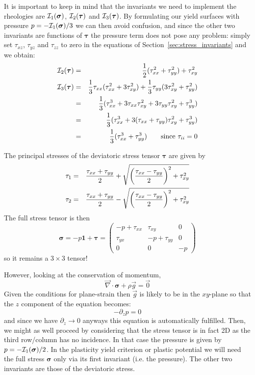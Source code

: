 It is important to keep in mind that the invariants we need to implement 
the rheologies are ${\cal I}_1({\bm \sigma})$,  ${\cal I}_2({\bm \tau})$ and ${\cal I}_3({\bm \tau})$.
By formulating our yield surfaces with pressure $p=-{\cal I}_1({\bm \sigma})/3$ we can then 
avoid confusion, and since the other two invariants are functions of ${\bm \tau}$ the pressure 
term does not pose any problem: simply set $\tau_{xz}$, $\tau_{yz}$ and $\tau_{zz}$ to zero in the 
equations of Section~\ref{sec:stress_invariants} and we obtain:
\begin{eqnarray}
{\cal I}_2({\bm \tau}) &=&\frac{1}{2}(\tau_{xx}^2 + \tau_{yy}^2 ) + \tau_{xy}^2 \\ 
{\cal I}_3({\bm \tau}) 
&=& \frac{1}{3} \tau_{xx} (  \tau_{xx}^2 + 3 \tau_{xy}^2 ) 
+ \frac{1}{3} \tau_{yy} (3 \tau_{xy}^2 +   \tau_{yy}^2 )   \nonumber\\
&=& \frac{1}{3}(  \tau_{xx}^3 + 3 \tau_{xx}\tau_{xy}^2  
+ 3 \tau_{yy} \tau_{xy}^2 +   \tau_{yy}^3 )   \nonumber\\
&=& \frac{1}{3}(  \tau_{xx}^3 + 3 (\tau_{xx}+\tau_{yy}) \tau_{xy}^2  +  \tau_{yy}^3 )   \nonumber\\
&=& \frac{1}{3}(  \tau_{xx}^3 +  \tau_{yy}^3 )  \qquad \text{since } \tau_{ii}=0 
\end{eqnarray}



The principal stresses of the deviatoric stress tensor $\bm\tau$ are given by
\begin{eqnarray}
\tau_1 &=& \frac{ \tau_{xx}+\tau_{yy}}{2} 
+ \sqrt{ \left(\frac{\tau_{xx}-\tau_{yy}}{2}\right)^2 +\tau_{xy}^2 } \nonumber\\
\tau_2 &=& \frac{ \tau_{xx}+\tau_{yy}}{2} 
- \sqrt{ \left(\frac{\tau_{xx}-\tau_{yy}}{2}\right)^2 +\tau_{xy}^2 } 
\end{eqnarray}
The full stress tensor is then
\[
\bm\sigma = -p \bm 1 + \bm\tau
= \left(\begin{array}{ccc}
-p+\tau_{xx} & \tau_{xy} & 0 \\
\tau_{yx} & -p+\tau_{yy} & 0 \\
0 & 0 & -p
\end{array}\right)
\]
so it remains a $3\times 3$ tensor!

However, looking at the conservation of momentum, 
\[
\vec\nabla \cdot \bm\sigma + \rho \vec g = \vec 0
\]
Given the conditions for plane-strain then $\vec g$ is likely to be in 
the $xy$-plane so that the $z$ component of the equation becomes:
\[
-\partial_z p = 0
\]
and since we have $\partial_z \rightarrow 0$ anyways this equation 
is automatically fulfilled. Then, we might as well proceed 
by considering that the stress tensor is in fact 2D as the third row/column
has no incidence. In that case the pressure is given by $p=-{\cal I}_1(\bm\sigma)/2$.
In the plasticity yield criterion or plastic potential we will 
need the full stress ${\bm \sigma}$ only via its first invariant (i.e. the pressure). 
The other two invariants are those of the deviatoric stress. 


